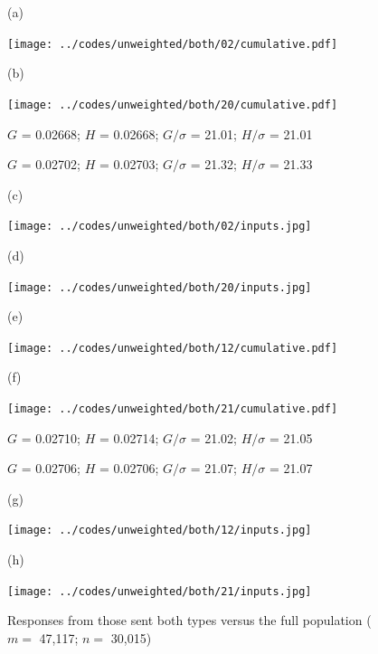 \documentclass{article}
\newlength{\vertsep}
\newlength{\imsize}
\newlength{\imsized}
\begin{document}
\begin{figure}
\begin{centering}

(a) \parbox{\imsize}{\texttt{[image: ../codes/unweighted/both/02/cumulative.pdf]}}
\quad\quad
(b) \parbox{\imsize}{\texttt{[image: ../codes/unweighted/both/20/cumulative.pdf]}}

\parbox{\imsized}{\hfil \footnotesize $G$ = 0.02668; $H$ = 0.02668;
$G/\sigma$ = 21.01; $H/\sigma$ = 21.01}
\parbox{\imsized}{\hfil \footnotesize $G$ = 0.02702; $H$ = 0.02703;
$G/\sigma$ = 21.32; $H/\sigma$ = 21.33}

\vspace{\vertsep}

(c) \parbox{\imsize}{\texttt{[image: ../codes/unweighted/both/02/inputs.jpg]}}
\quad\quad
(d) \parbox{\imsize}{\texttt{[image: ../codes/unweighted/both/20/inputs.jpg]}}

\vspace{\vertsep}

(e) \parbox{\imsize}{\texttt{[image: ../codes/unweighted/both/12/cumulative.pdf]}}
\quad\quad
(f) \parbox{\imsize}{\texttt{[image: ../codes/unweighted/both/21/cumulative.pdf]}}

\parbox{\imsized}{\hfil \footnotesize $G$ = 0.02710; $H$ = 0.02714;
$G/\sigma$ = 21.02; $H/\sigma$ = 21.05}
\parbox{\imsized}{\hfil \footnotesize $G$ = 0.02706; $H$ = 0.02706;
$G/\sigma$ = 21.07; $H/\sigma$ = 21.07}

\vspace{\vertsep}

(g) \parbox{\imsize}{\texttt{[image: ../codes/unweighted/both/12/inputs.jpg]}}
\quad\quad
(h) \parbox{\imsize}{\texttt{[image: ../codes/unweighted/both/21/inputs.jpg]}}

\end{centering}
\caption{Responses from those sent both types versus the full population
($m =$ 47,117; $n =$ 30,015)}
\label{both}
\end{figure}
\end{document}
